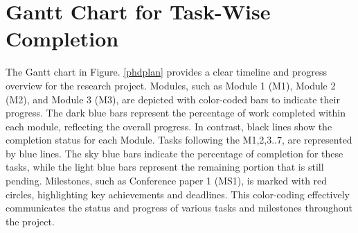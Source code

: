 \section{Gantt Chart for Task-Wise Completion}
The Gantt chart  in Figure. \ref{phdplan} provides a clear timeline and progress overview for the research project. Modules, such as Module 1 (M1), Module 2 (M2), and Module 3 (M3), are depicted with color-coded bars to indicate their progress. The dark blue bars represent the percentage of work completed within each module, reflecting the overall progress. In contrast, black lines show the completion status for each Module. Tasks following the M1,2,3..7, are represented by blue lines. The sky blue bars indicate the percentage of completion for these tasks, while the light blue bars represent the remaining portion that is still pending. Milestones, such as Conference paper 1 (MS1), is marked with red circles, highlighting key achievements and deadlines. This color-coding effectively communicates the status and progress of various tasks and milestones throughout the project.

